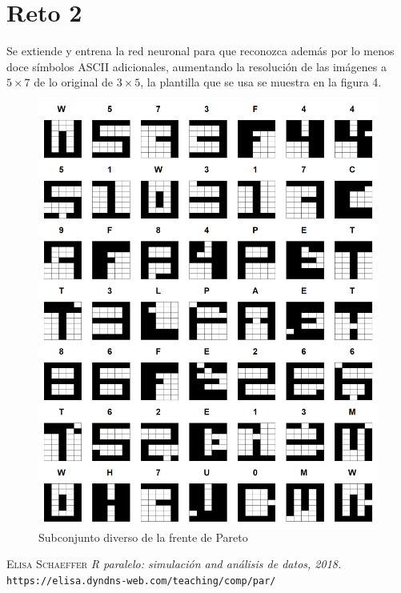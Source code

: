 \documentclass[10pt,a4paper]{article}
\begin{document}
\section*{Reto 2}
Se extiende y entrena la red neuronal para que reconozca además por lo menos doce símbolos ASCII adicionales, aumentando la resolución de las imágenes a $5\times 7$ de lo original de $3\times 5$, la plantilla que se usa se muestra en la figura 4. 
\begin{figure}[H]
  \centering
  \includegraphics[scale=.2]{plantilla}
  \caption{Subconjunto diverso de la frente de Pareto }
\end{figure} 


\begin{thebibliography}{X}
 \textsc{Elisa Schaeffer} \textit{R paralelo: simulación and análisis de datos, 2018.} \texttt{https://elisa.dyndns-web.com/teaching/comp/par/ }

\end{thebibliography}
\end{document}
